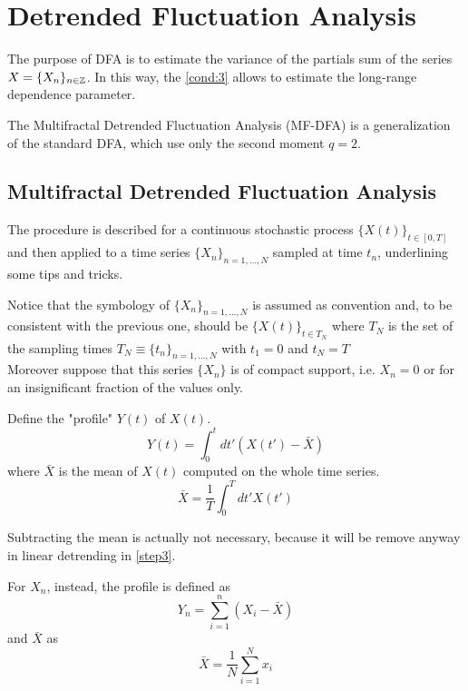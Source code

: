 \section{Detrended Fluctuation Analysis}\label{sec:dfa}

The purpose of DFA is to estimate the variance of the partials sum of the series $X = \{ X_n \}_{n \in \mathbb{Z}}$. In this way, the \autoref{cond:3} allows to estimate the long-range dependence parameter. 

The Multifractal Detrended Fluctuation Analysis (MF-DFA) is a generalization of the standard DFA, which use only the second moment $q = 2$. 

\subsection{Multifractal Detrended Fluctuation Analysis}
The procedure is described for a continuous stochastic process $\{X(t)\}_{t\in [0, T]}$ and then applied to a time series $\{ X_n \}_{n = 1, \dots, N} $ sampled at time $t_n$, underlining some tips and tricks. 

Notice that the symbology of $\{ X_n \}_{n = 1, \dots, N} $ is assumed as convention and, to be consistent with the previous one, should be
$\{ X(t) \}_{t \in T_N}$ where $T_N$ is the set of the sampling times $T_N \equiv \{ t_n\}_{n = 1, \dots, N}$ with $t_1 = 0$ and $t_N = T$ \\
Moreover suppose that this series $\{ X_n \}$ is of compact support, i.e. $X_n = 0$ or for an insignificant fraction of the values only. 

\begin{step}\label{step1}
Define the "profile" $Y(t)$ of $X(t)$.
\begin{equation}
	Y( t ) = \int_{0}^{t} dt' (X( t' ) - \bar{X} ) 
\end{equation}
where $\bar{X}$ is the mean of $X(t)$ computed on the whole time series.
\begin{equation}
	\bar{X} = \frac{1}{T} \int_{0}^{T} dt' X( t' )
\end{equation}

Subtracting the mean is actually not necessary, because it will be remove anyway in linear detrending in \autoref{step3}.

For $X_n$, instead, the profile is defined as 
\begin{equation}
	Y_n = \sum_{i=1}^{n} \left( X_i - \bar{X} \right)
\end{equation}
and $\bar{X}$ as 
\begin{equation}
	\bar{X} = \frac{1}{N} \sum_{i=1}^{N} x_i 
\end{equation}
\end{step}

